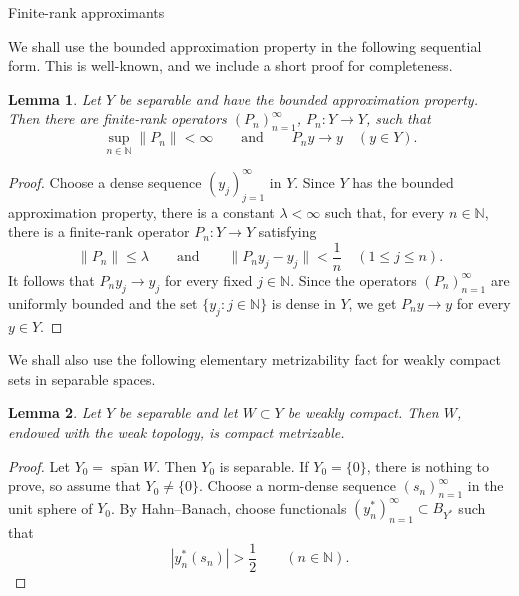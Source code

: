 \documentclass[11pt,reqno]{amsart}
\makeatletter
\theoremstyle{plain}
\newtheorem{lemma}[lemma]{Lemma}
\theoremstyle{definition}
\newcommand{\N}{\mathbb N}
\newcounter{problempaper}
\newenvironment{problempaperbody}{%
  \setcounter{subsection}{0}%
  \setcounter{subsubsection}{0}%
  \setcounter{paragraph}{0}%
  \renewcommand{\thesubsection}{\arabic{subsection}}%
  \renewcommand{\thesubsubsection}{\thesubsection.\arabic{subsubsection}}%
  \renewcommand{\theparagraph}{\thesubsubsection.\arabic{paragraph}}%
  \let\problem@outersection\section
  \let\problem@outersubsection\subsection
  \let\problem@outersubsubsection\subsubsection
  \let\problem@outerparagraph\paragraph
  \let\section\problem@papersection
  \let\subsection\problem@papersubsection
  \let\subsubsection\problem@papersubsubsection
}{%
  \let\section\problem@outersection
  \let\subsection\problem@outersubsection
  \let\subsubsection\problem@outersubsubsection
  \let\paragraph\problem@outerparagraph
}
\newcommand{\problem@target}[2]{%
  \hypertarget{problem-\theproblempaper-#1-#2}{}%
}
\newcommand{\problem@paperheading}[3]{%
  \par\bigskip
  \problem@target{#1}{#2}%
  \noindent{\large\bfseries #2.\quad #3\par}%
  \nobreak\smallskip
}
\newcommand{\problem@papersubheading}[3]{%
  \par\medskip
  \problem@target{#1}{#2}%
  \noindent{\normalsize\bfseries #2.\quad #3\par}%
  \nobreak\smallskip
}
\newcommand{\problem@papersubsubheading}[3]{%
  \par\smallskip
  \problem@target{#1}{#2}%
  \noindent{\normalsize\itshape #2.\quad #3.\ }%
}
\def\problem@papersection{%
  \@ifstar{\problem@papersectionstar}{\problem@papersectionnostar}%
}
\def\problem@papersectionstar#1{%
  \par\bigskip\noindent{\large\bfseries #1\par}\nobreak\smallskip
}
\def\problem@papersectionnostar#1{%
  \refstepcounter{subsection}%
  \setcounter{subsubsection}{0}%
  \setcounter{paragraph}{0}%
  \problem@paperheading{section}{\thesubsection}{#1}%
  \problem@writecontentsline{section}{\thesubsection}{#1}%
}
\def\problem@papersubsection{%
  \@ifstar{\problem@papersubsectionstar}{\problem@papersubsectionnostar}%
}
\def\problem@papersubsectionstar#1{%
  \par\medskip\noindent{\normalsize\bfseries #1\par}\nobreak\smallskip
}
\def\problem@papersubsectionnostar#1{%
  \refstepcounter{subsubsection}%
  \setcounter{paragraph}{0}%
  \problem@papersubheading{subsection}{\thesubsubsection}{#1}%
  \problem@writecontentsline{subsection}{\thesubsubsection}{#1}%
}
\def\problem@papersubsubsection{%
  \@ifstar{\problem@papersubsubsectionstar}{\problem@papersubsubsectionnostar}%
}
\def\problem@papersubsubsectionstar#1{%
  \par\smallskip\noindent{\normalsize\itshape #1.\ }%
}
\def\problem@papersubsubsectionnostar#1{%
  \refstepcounter{paragraph}%
  \problem@papersubsubheading{subsubsection}{\theparagraph}{#1}%
  \problem@writecontentsline{subsubsection}{\theparagraph}{#1}%
}
\newcommand{\problem@writecontentsline}[3]{%
  \begingroup
  \protected@write\@auxout{}{%
    \string\problemcontentsentry{\theproblempaper}{#1}{#2}{#3}{\thepage}%
  }%
  \endgroup
}
\newcommand{\problemcontentsentry}[5]{%
  \@ifundefined{problemcontents@#1}{%
    \expandafter\gdef\csname problemcontents@#1\endcsname{}%
  }{}%
  \expandafter\g@addto@macro\csname problemcontents@#1\endcsname{%
    \problemcontentsline{#1}{#2}{#3}{#4}{#5}%
  }%
}
\newcommand{\problemcontentslink}[4]{%
  \hyperlink{problem-#1-#2-#3}{#4}%
}
\newcommand{\problemcontentsline}[5]{%
  \ifstrequal{#2}{section}{%
    \par\noindent
    \problemcontentslink{#1}{#2}{#3}{\makebox[2.5em][l]{#3}#4}%
    \nobreak\dotfill
    \problemcontentslink{#1}{#2}{#3}{#5}\par
  }{%
    \ifstrequal{#2}{subsection}{%
      \par\noindent\hspace*{1.5em}%
      \problemcontentslink{#1}{#2}{#3}{\makebox[3.5em][l]{#3}#4}%
      \nobreak\dotfill
      \problemcontentslink{#1}{#2}{#3}{#5}\par
    }{%
      \par\noindent\hspace*{3em}%
      \problemcontentslink{#1}{#2}{#3}{\makebox[4.5em][l]{#3}#4}%
      \nobreak\dotfill
      \problemcontentslink{#1}{#2}{#3}{#5}\par
    }%
  }%
}
\makeatother
\begin{document}
\begin{problempaperbody}
\section{Finite-rank approximants}
\label{p5:sec:approximants}

We shall use the bounded approximation property in the following sequential form. This is well-known, and we include a short proof for completeness.

\begin{lemma}
\label{p5:lem:strong-approximation}
Let $Y$ be separable and have the bounded approximation property. Then there are finite-rank operators $(P_n)_{n=1}^{\infty}$, $P_n\colon Y\to Y$, such that
\begin{equation*}
        \sup_{n\in\N}\|P_n\|<\infty \qquad\text{and}\qquad
        P_ny\to y \quad(y\in Y).
\end{equation*}
\end{lemma}

\begin{proof}
Choose a dense sequence $(y_j)_{j=1}^{\infty}$ in $Y$. Since $Y$ has the bounded approximation property, there is a constant $\lambda<\infty$ such that, for every $n\in\N$, there is a finite-rank operator $P_n\colon Y\to Y$ satisfying
\begin{equation*}
        \|P_n\|\leq\lambda
        \qquad\text{and}\qquad
        \|P_ny_j-y_j\|<\frac{1}{n} \quad(1\leq j\leq n).
\end{equation*}
It follows that $P_ny_j\to y_j$ for every fixed $j\in\N$. Since the operators $(P_n)_{n=1}^{\infty}$ are uniformly bounded and the set $\{y_j:j\in\N\}$ is dense in $Y$, we get $P_ny\to y$ for every $y\in Y$.
\end{proof}

We shall also use the following elementary metrizability fact for weakly compact sets in separable spaces.

\begin{lemma}
\label{p5:lem:weak-compact-metrizable}
Let $Y$ be separable and let $W\subset Y$ be weakly compact. Then $W$, endowed with the weak topology, is compact metrizable.
\end{lemma}

\begin{proof}
Let $Y_0=\overline{\operatorname{span}} W$. Then $Y_0$ is separable. If $Y_0=\{0\}$, there is nothing to prove, so assume that $Y_0\ne\{0\}$. Choose a norm-dense sequence $(s_n)_{n=1}^{\infty}$ in the unit sphere of $Y_0$. By Hahn--Banach, choose functionals $(y_n^*)_{n=1}^{\infty}\subset B_{Y^*}$ such that
\begin{equation*}
        |y_n^*(s_n)|>\frac{1}{2} \qquad(n\in\N).
\end{equation*}


\end{proof}
\end{problempaperbody}
\end{document}
